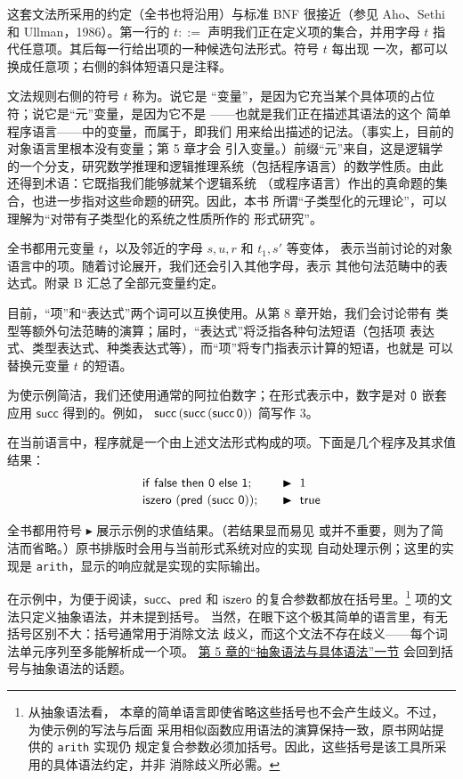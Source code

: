 这套文法所采用的约定（全书也将沿用）与标准 BNF 很接近（参见 Aho、Sethi
和 Ullman，1986）。第一行的 \(t::=\) 声明我们正在定义项的集合，并用字母
\(t\) 指代任意项。其后每一行给出项的一种候选句法形式。符号 \(t\) 每出现
一次，都可以换成任意项；右侧的斜体短语只是注释。

文法规则右侧的符号 \(t\) 称为。说它是
“变量”，是因为它充当某个具体项的占位符；说它是“元”变量，是因为它不是
——也就是我们正在描述其语法的这个
简单程序语言——中的变量，而属于，即我们
用来给出描述的记法。（事实上，目前的对象语言里根本没有变量；第 5 章才会
引入变量。）前缀“元”来自，这是逻辑学
的一个分支，研究数学推理和逻辑推理系统（包括程序语言）的数学性质。由此
还得到术语：它既指我们能够就某个逻辑系统
（或程序语言）作出的真命题的集合，也进一步指对这些命题的研究。因此，本书
所谓“子类型化的元理论”，可以理解为“对带有子类型化的系统之性质所作的
形式研究”。

全书都用元变量 \(t\)，以及邻近的字母 \(s,u,r\) 和 \(t_1,s'\) 等变体，
表示当前讨论的对象语言中的项。随着讨论展开，我们还会引入其他字母，表示
其他句法范畴中的表达式。附录 B 汇总了全部元变量约定。

目前，“项”和“表达式”两个词可以互换使用。从第 8 章开始，我们会讨论带有
类型等额外句法范畴的演算；届时，“表达式”将泛指各种句法短语（包括项
表达式、类型表达式、种类表达式等），而“项”将专门指表示计算的短语，也就是
可以替换元变量 \(t\) 的短语。

为使示例简洁，我们还使用通常的阿拉伯数字；在形式表示中，数字是对
\(\mathsf{0}\) 嵌套应用 \(\mathsf{succ}\) 得到的。例如，
\(\mathsf{succ}\,(\mathsf{succ}\,(\mathsf{succ}\,\mathsf{0}))\) 简写作 \(3\)。

在当前语言中，程序就是一个由上述文法形式构成的项。下面是几个程序及其求值
结果：
\[
\begin{array}{@{}l@{\qquad}l@{}}
 \mathsf{if\ false\ then\ 0\ else\ 1}; & \blacktriangleright\ 1\\[2pt]
 \mathsf{iszero\ (pred\ (succ\ 0))}; & \blacktriangleright\ \mathsf{true}
\end{array}
\]

全书都用符号 \(\blacktriangleright\) 展示示例的求值结果。（若结果显而易见
或并不重要，则为了简洁而省略。）原书排版时会用与当前形式系统对应的实现
自动处理示例；这里的实现是 \texttt{arith}，显示的响应就是实现的实际输出。

在示例中，为便于阅读，\(\mathsf{succ}\)、\(\mathsf{pred}\) 和
\(\mathsf{iszero}\) 的复合参数都放在括号里。\footnote{从抽象语法看，
本章的简单语言即使省略这些括号也不会产生歧义。不过，为使示例的写法与后面
采用相似函数应用语法的演算保持一致，原书网站提供的 \texttt{arith} 实现仍
规定复合参数必须加括号。因此，这些括号是该工具所采用的具体语法约定，并非
消除歧义所必需。} 项的文法只定义抽象语法，并未提到括号。
当然，在眼下这个极其简单的语言里，有无括号区别不大：括号通常用于消除文法
歧义，而这个文法不存在歧义——每个词法单元序列至多能解析成一个项。
\hyperref[sec:5.1-abstract-concrete-syntax]{第 5 章的“抽象语法与具体语法”一节}
会回到括号与抽象语法的话题。

